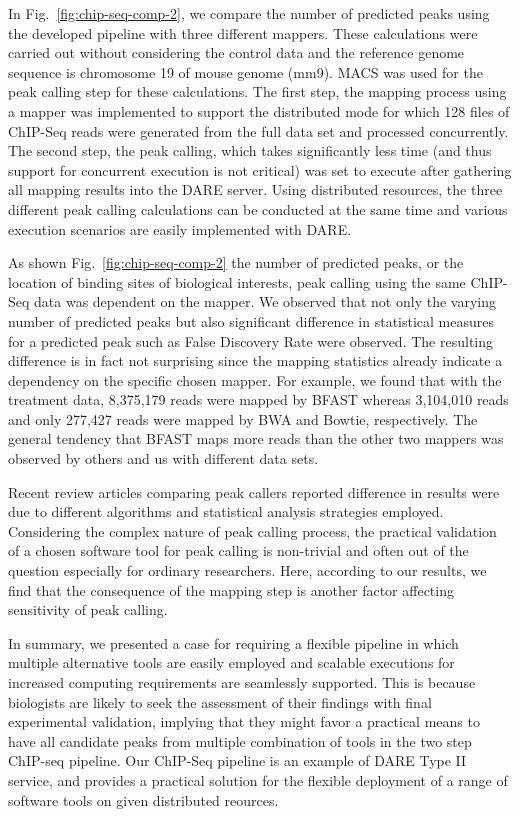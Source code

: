 \documentclass{cpeauth}
\begin{document}
In Fig.~\ref{fig:chip-seq-comp-2}, we compare the number of predicted
peaks using the developed pipeline with three different mappers.
These calculations were carried out without considering the control
data and the reference genome sequence is chromosome 19 of mouse
genome (mm9).  MACS was used for the peak calling step for these
calculations.  The first step, the mapping process using a mapper was
implemented to support the distributed mode for which 128 files of
ChIP-Seq reads were generated from the full data set and processed
concurrently. The second step, the peak calling, which takes
significantly less time (and thus support for concurrent execution is
not critical) was set to execute after gathering all mapping results
into the DARE server.  Using distributed resources, the three
different peak calling calculations can be conducted at the same time
and various execution scenarios are easily implemented with DARE.

As shown Fig.~\ref{fig:chip-seq-comp-2} the number of predicted peaks,
or the location of binding sites of biological interests, peak calling
using the same ChIP-Seq data was dependent on the mapper.  We observed
that not only the varying number of predicted peaks but also
significant difference in statistical measures for a predicted peak
such as False Discovery Rate were observed.  The resulting difference
is in fact not surprising since the mapping statistics already
indicate a dependency on the specific chosen mapper.  For example, we found
that with the treatment data, 8,375,179 reads were mapped by BFAST whereas
3,104,010 reads and only 277,427 reads were mapped by BWA and Bowtie,
respectively.  The general tendency that BFAST maps more reads than
the other two mappers was observed by others and us with different
data sets\cite{bfast2009,mapping-survey}.

Recent review articles comparing peak callers reported difference in
results were due to different algorithms and statistical analysis
strategies employed\cite{wilbanks, laajala}.  Considering the complex
nature of peak calling process, the practical validation of a chosen
software tool for peak calling is non-trivial and often out of the
question especially for ordinary researchers.  Here, according to our
results, we find that the consequence of the mapping step is another
factor affecting sensitivity of peak calling.

In summary, we presented a case for requiring a flexible pipeline in
which multiple alternative tools are easily employed and scalable
executions for increased computing requirements are seamlessly
supported. This is because biologists are likely to seek the
assessment of their findings with final experimental validation,
implying that they might favor a practical means to have all candidate
peaks from multiple combination of tools in the two step ChIP-seq
pipeline.  Our ChIP-Seq pipeline is an example of DARE Type II
service, and provides a practical solution for the flexible deployment
of a range of software tools on given distributed reources.
\end{document}
